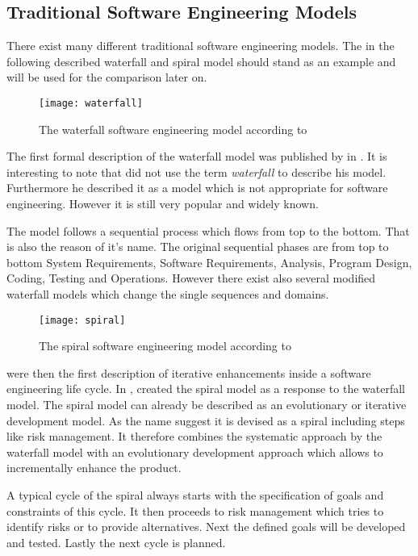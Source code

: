 \subsection{Traditional Software Engineering Models} %

There exist many different traditional software engineering models. The in the
following described waterfall and spiral model should stand as an example and
will be used for the comparison later on.

\begin{figure}[htbp]
  \centering
  \texttt{[image: waterfall]}
  \caption{The waterfall software engineering model according to \textcite{Royce1970}}
\end{figure}

The first formal description of the waterfall model was published by
\textcite{Royce1970} in \citeyear{Royce1970}. It is interesting to note that
\citeauthor{Royce1970} did not use the term \emph{waterfall} to describe his
model. Furthermore he described it as a model which is not appropriate for
software engineering. However it is still very popular and widely known.

The model follows a sequential process which flows from top to the bottom. That
is also the reason of it's name. The original sequential phases are from top to
bottom System Requirements, Software Requirements, Analysis, Program Design,
Coding, Testing and Operations. However there exist also several modified
waterfall models which change the single sequences and domains.

\begin{figure}[htbp]
  \centering
  \texttt{[image: spiral]}
  \caption{The spiral software engineering model according to \textcite{Boehm1988}}
\end{figure}

\textcite{Basili1975} were then the first description of iterative enhancements
inside a software engineering life cycle. In \citeyear{Boehm1988},
\textcite{Boehm1988} created the spiral model as a response to the waterfall
model. The spiral model can already be described as an evolutionary or
iterative development model. As the name suggest it is devised as a spiral
including steps like risk management. It therefore combines the systematic
approach by the waterfall model with an evolutionary development approach which
allows to incrementally enhance the product.

A typical cycle of the spiral always starts with the specification of goals and
constraints of this cycle. It then proceeds to risk management which tries to
identify risks or to provide alternatives. Next the defined goals will be
developed and tested. Lastly the next cycle is planned.

